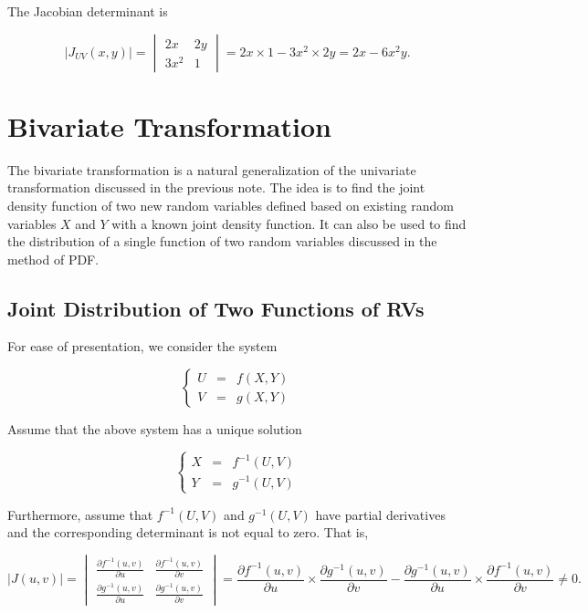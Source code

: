 \documentclass[
]{book}
\begin{document}
The Jacobian determinant is

\[
\Big| J_{UV}(x, y) \Big| = \begin{vmatrix}
2x   & 2y \\
3x^2 & 1  
\end{vmatrix} = 2x\times 1-3x^2\times 2y = 2x-6x^2y.
\]

\hfill\break

\hypertarget{bivariate-transformation}{%
\section{Bivariate Transformation}\label{bivariate-transformation}}

The bivariate transformation is a natural generalization of the univariate transformation discussed in the previous note. The idea is to find the joint density function of two new random variables defined based on existing random variables \(X\) and \(Y\) with a known joint density function. It can also be used to find the distribution of a single function of two random variables discussed in the method of PDF.

\hypertarget{joint-distribution-of-two-functions-of-rvs}{%
\subsection{Joint Distribution of Two Functions of RVs}\label{joint-distribution-of-two-functions-of-rvs}}

For ease of presentation, we consider the system

\[
\left\{
\begin{array}{rrr}
   U & = & f(X, Y) \\
   V & = & g(X, Y) 
\end{array}\right.
\]

Assume that the above system has a unique solution

\[
\left\{
\begin{array}{rrr}
   X & = & f^{-1}(U, V) \\
   Y & = & g^{-1}(U, V) 
\end{array}\right.
\]

Furthermore, assume that \(f^{-1}(U, V)\) and \(g^{-1}(U, V)\) have partial derivatives and the corresponding determinant is not equal to zero. That is,

\[
\Big| J(u, v) \Big| = \begin{vmatrix}
\frac{\partial f^{-1}(u, v)}{\partial u} & \frac{\partial f^{-1}(u, v)}{\partial v} \\
\frac{\partial g^{-1}(u, v)}{\partial u} & \frac{\partial g^{-1}(u, v)}{\partial v}  
\end{vmatrix} = \frac{\partial f^{-1}(u, v)}{\partial u}\times \frac{\partial g^{-1}(u, v)}{\partial v} - \frac{\partial g^{-1}(u, v)}{\partial u} \times \frac{\partial f^{-1}(u, v)}{\partial v} \ne 0.
\]
\end{document}
